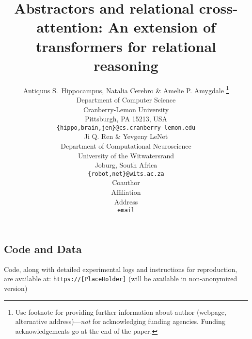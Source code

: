 \documentclass{article}
\title{Abstractors and relational cross-attention: An extension of transformers for %
relational reasoning}
\author{Antiquus S.~Hippocampus, Natalia Cerebro \& Amelie P. Amygdale \thanks{ Use footnote for providing further information
about author (webpage, alternative address)---\emph{not} for acknowledging
funding agencies.  Funding acknowledgements go at the end of the paper.} \\
Department of Computer Science\\
Cranberry-Lemon University\\
Pittsburgh, PA 15213, USA \\
\texttt{\{hippo,brain,jen\}@cs.cranberry-lemon.edu} \\
\And
Ji Q. Ren \& Yevgeny LeNet \\
Department of Computational Neuroscience \\
University of the Witwatersrand \\
Joburg, South Africa \\
\texttt{\{robot,net\}@wits.ac.za} \\
\AND
Coauthor \\
Affiliation \\
Address \\
\texttt{email}
}
\begin{document}
\maketitle






% 
% 



\subsection*{Code and Data}
Code, along with detailed experimental logs and instructions for reproduction, are available at: \texttt{https://[PlaceHolder]} (will be available in non-anonymized version)

\medskip

\clearpage
{%

% 


}


\clearpage
\appendix


% 
% 
% 
\end{document}
